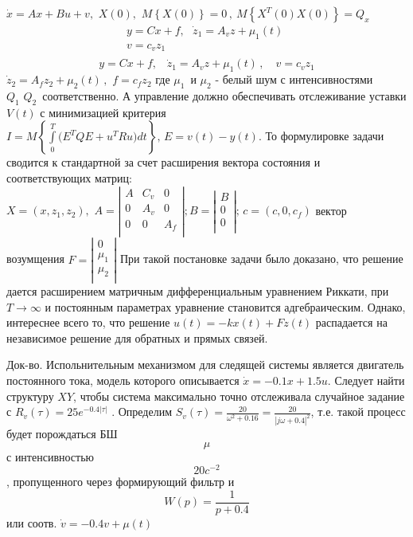 \documentclass[preprint,russian,a5paper,10pt,twoside,mediummath]{ncc}
\begin{document}
$\dot{x}=Ax+Bu+v,\,\,X(0),\,\,M\left\{ X(0) \right\}=0\,,\ M\left\{ {{X}^{T}}(0)X(0) \right\}={{Q}_{x}}\,$ 
\[\begin{matrix}
   y=Cx+f,\,\,\,\,{{{\dot{z}}}_{1}}={{A}_{v}}z+{{\mu }_{1}}(t)\,\,  \\
   v={{c}_{v}}{{z}_{1}}  \\
\end{matrix}\]\[y=Cx+f,\,\,\,\,\,{{\dot{z}}_{1}}={{A}_{v}}z+{{\mu }_{1}}(t)\,,\,\,\,\,\,\,v={{c}_{v}}{{z}_{1}}\]	
${{\dot{z}}_{2}}={{A}_{f}}{{z}_{2}}+{{\mu }_{2}}(t)\,,\,\,f={{c}_{f}}{{z}_{2}}$ где ${{\mu }_{1}}\,$ и ${{\mu }_{2}}$ - белый шум с интенсивностями ${{Q}_{1}}\,\,{{Q}_{2}}\,$ соответственно. 
А управление должно обеспечивать отслеживание уставки $V(t)$ с минимизацией критерия $I=M\left\{ \int\limits_{0}^{T}{({{E}^{T}}QE+{{u}^{T}}Ru})dt \right\},\,E=v(t)-y(t).$ То формулировке задачи сводится к стандартной за счет расширения вектора состояния и соответствующих матриц: $X=(x,{{z}_{1}},{{z}_{2}}),\,\,A=\left| \begin{matrix}
   A & {{C}_{v}} & 0  \\
   0 & {{A}_{v}} & 0  \\
   0 & 0 & {{A}_{f}}  \\
\end{matrix} \right|;B=\left| \begin{matrix}
   B  \\
   0  \\
   0  \\
\end{matrix} \right|;\,c=(c,0,{{c}_{f}})$ 
вектор возумщения $F=\left| \begin{matrix}
   0  \\
   {{\mu }_{1}}  \\
   {{\mu }_{2}}  \\
\end{matrix} \right|$ 
При такой постановке задачи было доказано, что решение дается расширением матричным дифференциальным уравнением Риккати, при $T\to \infty $ и постоянным параметрах уравнение становится адгебраическим. Однако, интереснее всего то, что решение $u(t)=-kx(t)+Fz(t)$  распадается на независимое решение для обратных и прямых связей. 
\par Док-во. Испольнительным механизмом для следящей системы является двигатель постоянного тока, модель которого описывается  $\dot{x}=-0.1x+1.5u$. Следует найти структуру $X Y$, чтобы система максимально точно отслеживала случайное задание с ${{R}_{v}}(\tau )=25{{e}^{-0.4\left| \tau  \right|}}$ . Определим ${{S}_{v}}(\tau )=\frac{20}{{{\omega }^{2}}+0.16}=\frac{20}{{{\left| j\omega +0.4 \right|}^{2}}}$, т.е. такой процесс будет порождаться БШ \[\mu \] с интенсивностью \[20{{c}^{-2}}\], пропущенного через формирующий фильтр и \[W(p)=\frac{1}{p+0.4}\] или соотв. $\dot{v}=-0.4v+\mu (t)$ 
\end{document}
